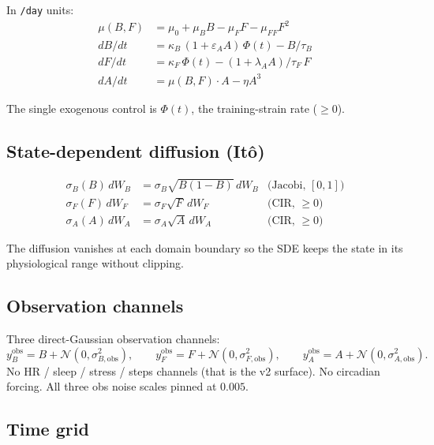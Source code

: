 \documentclass[11pt,a4paper]{article}
\begin{document}
In \texttt{/day} units:
\begin{align}
  \mu(B, F)        &= \mu_0 + \mu_B B - \mu_F F - \mu_{FF} F^2 \\
  dB/dt            &= \kappa_B \, (1 + \varepsilon_A A) \, \Phi(t) - B / \tau_B \\
  dF/dt            &= \kappa_F \, \Phi(t) - (1 + \lambda_A A) / \tau_F \, F \\
  dA/dt            &= \mu(B, F) \cdot A - \eta A^3
\end{align}

The single exogenous control is $\Phi(t)$, the training-strain rate
($\geq 0$).

\subsection{State-dependent diffusion (It\^o)}

\begin{align}
  \sigma_B(B) \, dW_B &= \sigma_B \sqrt{B(1-B)} \, dW_B  & \text{(Jacobi, $[0,1]$)} \\
  \sigma_F(F) \, dW_F &= \sigma_F \sqrt{F} \, dW_F        & \text{(CIR, $\geq 0$)} \\
  \sigma_A(A) \, dW_A &= \sigma_A \sqrt{A} \, dW_A        & \text{(CIR, $\geq 0$)}
\end{align}

The diffusion vanishes at each domain boundary so the SDE keeps the
state in its physiological range without clipping.

\subsection{Observation channels}

Three direct-Gaussian observation channels:
\begin{equation}
  y^{\mathrm{obs}}_B = B + \mathcal{N}(0, \sigma_{B,\mathrm{obs}}^2),
  \qquad
  y^{\mathrm{obs}}_F = F + \mathcal{N}(0, \sigma_{F,\mathrm{obs}}^2),
  \qquad
  y^{\mathrm{obs}}_A = A + \mathcal{N}(0, \sigma_{A,\mathrm{obs}}^2).
\end{equation}
No HR / sleep / stress / steps channels (that is the v2 surface). No
circadian forcing. All three obs noise scales pinned at $0.005$.

\subsection{Time grid}
\end{document}
